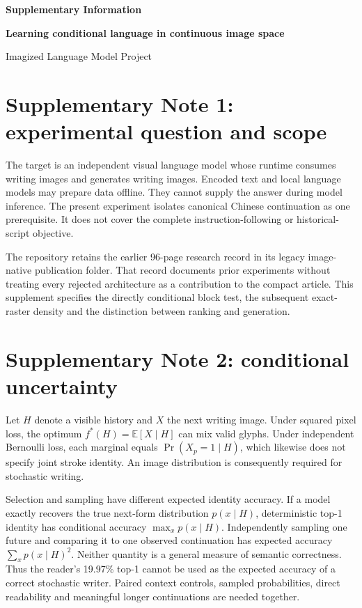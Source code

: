 \documentclass[10pt,a4paper]{article}
\begin{document}
\par\medskip

\renewcommand{\thefigure}{S\arabic{figure}}
{\sffamily\bfseries\Large Supplementary Information\par}
\medskip\noindent\textbf{Learning conditional language in continuous image space}\par
\medskip\noindent Imagized Language Model Project

\section*{Supplementary Note 1: experimental question and scope}
The target is an independent visual language model whose runtime consumes
writing images and generates writing images. Encoded text and local language
models may prepare data offline. They cannot supply the answer during model
inference. The present experiment isolates canonical Chinese continuation as
one prerequisite. It does not cover the complete instruction-following or
historical-script objective.

The repository retains the earlier 96-page research record in its legacy
image-native publication folder. That record documents prior
experiments without treating every rejected architecture as a contribution to
the compact article. This supplement specifies the directly conditional
block test, the subsequent exact-raster density and the distinction between
ranking and generation.

\section*{Supplementary Note 2: conditional uncertainty}
Let $H$ denote a visible history and $X$ the next writing image. Under squared
pixel loss, the optimum $f^*(H)=\mathbb{E}[X\mid H]$ can mix valid glyphs.
Under independent Bernoulli loss, each marginal equals
$\Pr(X_p=1\mid H)$, which likewise does not specify joint stroke identity.
An image distribution is consequently required for stochastic writing.

Selection and sampling have different expected identity accuracy. If a
model exactly recovers the true next-form distribution $p(x\mid H)$,
deterministic top-1 identity has conditional accuracy
$\max_x p(x\mid H)$. Independently sampling one future and comparing it to
one observed continuation has expected accuracy $\sum_x p(x\mid H)^2$.
Neither quantity is a general measure of semantic correctness. Thus the
reader's 19.97\% top-1 cannot be used as the expected accuracy of a correct
stochastic writer. Paired context controls, sampled probabilities, direct
readability and meaningful longer continuations are needed together.
\end{document}
